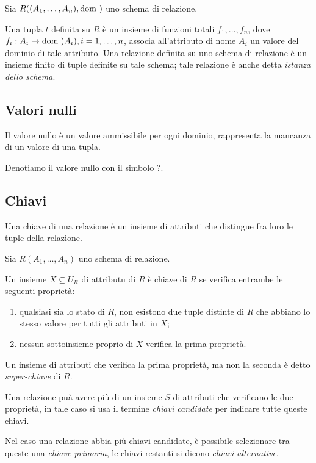 \begin{definizione}
  Sia $R((A_1,\dots,A_n),\text{dom })$ uno schema di relazione.

Una tupla $t$ definita su $R$ è un insieme di funzioni totali $f_1,\dots,f_n$,
dove $f_i:A_i\rightarrow\text{dom })A_i),i=1,\dots,n$, associa all'attributo di nome
$A_i$ un valore del dominio di tale attributo.
Una relazione definita su uno schema di relazione è un insieme finito di tuple
definite su tale schema; tale relazione è anche detta \emph{istanza dello
schema}.
\end{definizione}

\subsection{Valori nulli}%
\label{sub:Valori nulli}
Il valore nullo è un valore ammissibile per ogni dominio, rappresenta la
mancanza di un valore di una tupla.

Denotiamo il valore nullo con il simbolo $?$.

\subsection{Chiavi}%
\label{sub:Chiavi}
Una chiave di una relazione è un insieme di attributi che distingue fra loro le
tuple della relazione.

\begin{definizione}
Sia $R(A_1,\dots,A_n)$ uno schema di relazione.

Un insieme $X\subseteq U_R$ di attributu di $R$ è chiave di $R$ se verifica
entrambe le seguenti proprietà:
\begin{enumerate}
  \item qualsiasi sia lo stato di $R$, non esistono due tuple distinte di $R$
    che abbiano lo stesso valore per tutti gli attributi in $X$;
  \item nessun sottoinsieme proprio di $X$ verifica la prima proprietà.
\end{enumerate}
Un insieme di attributi che verifica la prima proprietà, ma non la seconda è
detto \emph{super-chiave} di $R$.
\end{definizione}

Una relazione puà avere più di un insieme $S$ di attributi che verificano le due
proprietà, in tale caso si usa il termine \emph{chiavi candidate} per indicare
tutte queste chiavi.

Nel caso una relazione abbia più chiavi candidate, è possibile selezionare tra
queste una \emph{chiave primaria}, le chiavi restanti si dicono \emph{chiavi
alternative}.

